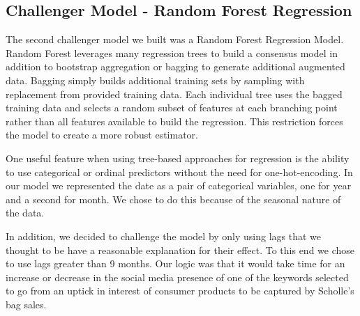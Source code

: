 \documentclass[12pt,oneside]{chicagocapstone}
\begin{document}
\subsection*{Challenger Model - Random Forest
Regression}\label{findings-RF}

The second challenger model we built was a Random Forest Regression
Model. Random Forest leverages many regression trees to build a
consensus model in addition to bootstrap aggregation or bagging to
generate additional augmented data. Bagging simply builds additional
training sets by sampling with replacement from provided training data.
Each individual tree uses the bagged training data and selects a random
subset of features at each branching point rather than all features
available to build the regression. This restriction forces the model to
create a more robust estimator.

One useful feature when using tree-based approaches for regression is
the ability to use categorical or ordinal predictors without the need
for one-hot-encoding. In our model we represented the date as a pair of
categorical variables, one for year and a second for month. We chose to
do this because of the seasonal nature of the data.

In addition, we decided to challenge the model by only using lags that
we thought to be have a reasonable explanation for their effect. To this
end we chose to use lags greater than 9 months. Our logic was that it
would take time for an increase or decrease in the social media presence
of one of the keywords selected to go from an uptick in interest of
consumer products to be captured by Scholle's bag sales.
\end{document}
